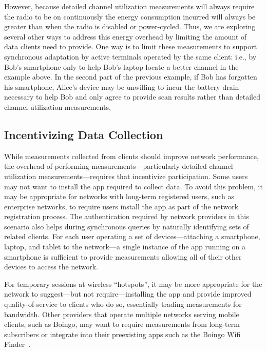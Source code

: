However, because detailed channel utilization measurements will always
require the radio to be on continuously the energy consumption incurred will
always be greater than when the radio is disabled or power-cycled. Thus, we
are exploring several other ways to address this energy overhead by limiting
the amount of data clients need to provide. One way is to limit these
measurements to support synchronous adaptation by active terminals operated
by the same client: i.e., by Bob's smartphone only to help Bob's laptop
locate a better channel in the example above. In the second part of the
previous example, if Bob has forgotten his smartphone, Alice's device may be
unwilling to incur the battery drain necessary to help Bob and only agree to
provide scan results rather than detailed channel utilization measurements.

\subsection{Incentivizing Data Collection}

While measurements collected from \PS{} clients should improve network
performance, the overhead of performing measurements---particularly detailed
channel utilization measurements---requires that \PS{} incentivize
participation. Some users may not want to install the \PS{} app required to
collect data. To avoid this problem, it may be appropriate for \PS{} networks
with long-term registered users, such as enterprise networks, to require
users install the \PS{} app as part of the network registration process. The
authentication required by network providers in this scenario also helps
during synchronous queries by naturally identifying sets of related clients.
For each user operating a set of devices---attaching a smartphone, laptop,
and tablet to the \PS{} network---a single instance of the \PS{} app running
on a smartphone is sufficient to provide measurements allowing all of their
other devices to access the network.

For temporary sessions at wireless ``hotspots'', it may be more appropriate
for the network to suggest---but not require---installing the \PS{} app and
provide improved quality-of-service to clients who do so, essentially trading
measurements for bandwidth. Other providers that operate multiple networks
serving mobile clients, such as Boingo, may want to require measurements from
long-term subscribers or integrate \PS{} into their preexisting apps such as
the Boingo Wifi Finder~\cite{boingo-playstore-url}.

